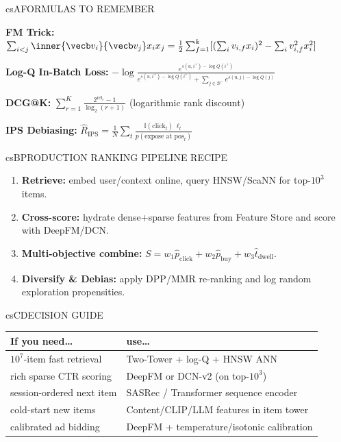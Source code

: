 \documentclass[../../../../master.tex]{subfiles}
\begin{document}
\begin{cscolumns}
\begin{cscard}{csA}{FORMULAS TO REMEMBER}
  \begin{csbul}
    \item \textbf{FM Trick:} $\sum_{i<j}\inner{\vecb v_i}{\vecb v_j}x_i x_j = \frac{1}{2}\sum_{f=1}^k[(\sum_i v_{i,f}x_i)^2-\sum_i v_{i,f}^2 x_i^2]$
    \item \textbf{Log-Q In-Batch Loss:} $-\log\frac{e^{s(u,i^+)-\log Q(i^+)}}{e^{s(u,i^+)-\log Q(i^+)}+\sum_{j\in\mathcal B^-}e^{s(u,j)-\log Q(j)}}$
    \item \textbf{DCG@K:} $\sum_{r=1}^K \frac{2^{\mathrm{rel}_r}-1}{\log_2(r+1)}$ (logarithmic rank discount)
    \item \textbf{IPS Debiasing:} $\hat R_{\mathrm{IPS}}=\frac{1}{N}\sum_{t}\frac{\mathbb{I}(\text{click}_t)\,\ell_t}{p(\text{expose at pos}_t)}$
  \end{csbul}
\end{cscard}

\begin{cscard}{csB}{PRODUCTION RANKING PIPELINE RECIPE}
  \begin{enumerate}[leftmargin=1.2em, itemsep=1pt, topsep=1pt, parsep=0pt]
    \item \textbf{Retrieve:} embed user/context online, query HNSW/ScaNN for top-$10^3$ items.
    \item \textbf{Cross-score:} hydrate dense+sparse features from Feature Store and score with DeepFM/DCN.
    \item \textbf{Multi-objective combine:} $S = w_1\hat p_{\mathrm{click}} + w_2\hat p_{\mathrm{buy}} + w_3\hat t_{\mathrm{dwell}}$.
    \item \textbf{Diversify \& Debias:} apply DPP/MMR re-ranking and log random exploration propensities.
  \end{enumerate}
\end{cscard}
\columnbreak

\begin{cscard}{csC}{DECISION GUIDE}
  \renewcommand{\arraystretch}{1.18}\small
  \begin{tabular}{@{}>{\raggedright\arraybackslash}p{3.1cm}>{\raggedright\arraybackslash}p{4.6cm}@{}}
    \textbf{If you need\ldots} & \textbf{use\ldots}\\ \hline
    $10^7$-item fast retrieval & Two-Tower + log-Q + HNSW ANN\\
    rich sparse CTR scoring & DeepFM or DCN-v2 (on top-$10^3$)\\
    session-ordered next item & SASRec / Transformer sequence encoder\\
    cold-start new items & Content/CLIP/LLM features in item tower\\
    calibrated ad bidding & DeepFM + temperature/isotonic calibration\\
  \end{tabular}
\end{cscard}


\end{cscolumns}
\end{document}
